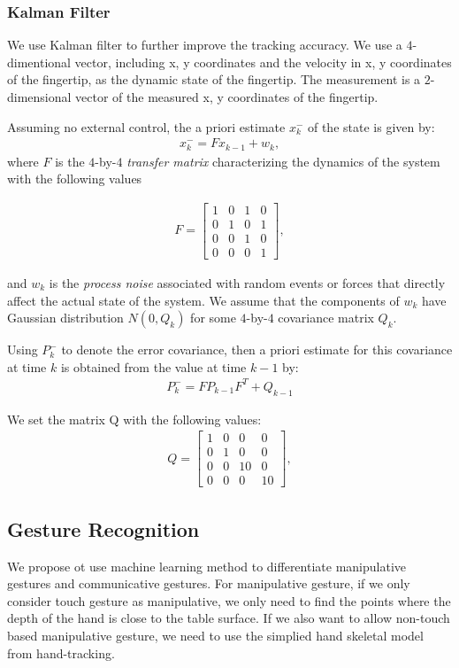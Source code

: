 \subsubsection{Kalman Filter}
We use Kalman filter to further improve the tracking accuracy. We use a
$4$-dimentional vector, including x, y coordinates and the velocity in x, y
coordinates of the fingertip, as the dynamic state of the fingertip.
The measurement is a $2$-dimensional vector of the measured x, y
coordinates of the fingertip. 

Assuming no external control, the a priori estimate $x_k^-$ of the state is
given by:
\begin{align*}
x_k^- = Fx_{k - 1} + w_k,
\end{align*}
where $F$ is the $4$-by-$4$ \textit{transfer matrix} characterizing the
dynamics of the system with the following values

\begin{align*}
F = \left[ \begin{array}{cccc}
	1 & 0 & 1 & 0 \\
	0 & 1 & 0 & 1 \\
	0 & 0 & 1 & 0 \\
	0 & 0 & 0 & 1 \end{array} \right],
\end{align*}

and $w_k$ is the
\textit{process noise} associated with random events or forces that directly affect the actual state of the system. We assume that the components of $w_k$
have Gaussian distribution $N(0, Q_k)$ for some $4$-by-$4$ covariance matrix
$Q_k$.

Using $P_k^-$ to denote the error covariance, then a priori estimate for this
covariance at time $k$ is obtained from the value at time $k - 1$ by:
\begin{align*}
P_k^- = FP_{k - 1}F^T + Q_{k - 1}
\end{align*}

We set the matrix Q with the following values:
\begin{align*}
Q = \left[ \begin{array}{cccc}
	1 & 0 & 0 & 0 \\
	0 & 1 & 0 & 0 \\
	0 & 0 & 10 & 0 \\
	0 & 0 & 0 & 10 \end{array} \right],
\end{align*}
   
\subsection{Gesture Recognition}
We propose ot use machine learning method to differentiate
manipulative gestures and communicative gestures. For manipulative gesture, if
we only consider touch gesture as manipulative, we only need to find the points
where the depth of the hand is close to the table surface. If we also want to
allow non-touch based manipulative gesture, we need to use the simplied hand
skeletal model from hand-tracking. 

